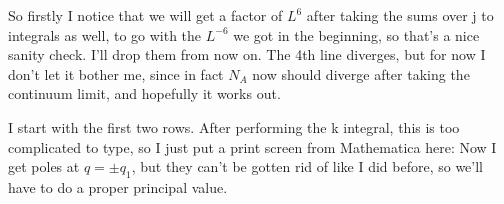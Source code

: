 \documentclass[a4paper]{article}
\begin{document}
So firstly I notice that we will get a factor of $L^6$ after taking the sums over j to integrals as well, to go with the $L^{-6}$ we got in the beginning, so that's a nice sanity check. I'll drop them from now on. The 4th line diverges, but for now I don't let it bother me, since in fact $N_A$ now should diverge after taking the continuum limit, and hopefully it works out.

I start with the first two rows. After performing the k integral, this is too complicated to type, so I just put a print screen from Mathematica here:\newline
Now I get poles at $q = \pm q_1$, but they can't be gotten rid of like I did before, so we'll have to do a proper principal value. 
\end{document}
